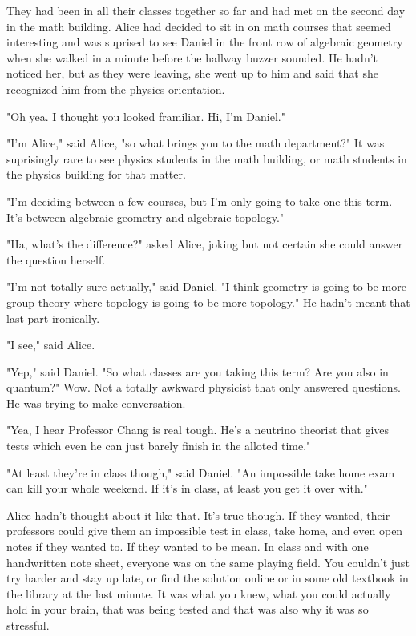 \mypause

They had been in all their classes together so far and had met on the second day in the math building. Alice had decided to sit in on math courses that seemed interesting and was suprised to see Daniel in the front row of algebraic geometry when she walked in a minute before the hallway buzzer sounded. He hadn't noticed her, but as they were leaving, she went up to him and said that she recognized him from the physics orientation. 

"Oh yea. I thought you looked framiliar. Hi, I'm Daniel."

"I'm Alice," said Alice, "so what brings you to the math department?" It was suprisingly rare to see physics students in the math building, or math students in the physics building for that matter.

"I'm deciding between a few courses, but I'm only going to take one this term. It's between algebraic geometry and algebraic topology."

"Ha, what's the difference?" asked Alice, joking but not certain she could answer the question herself.

"I'm not totally sure actually," said Daniel. "I think geometry is going to be more group theory where topology is going to be more topology." He hadn't meant that last part ironically.

"I see," said Alice.

"Yep," said Daniel. "So what classes are you taking this term? Are you also in quantum?" Wow. Not a totally awkward physicist that only answered questions. He was trying to make conversation.

"Yea, I hear Professor Chang is real tough. He's a neutrino theorist that gives tests which even he can just barely finish in the alloted time."

"At least they're in class though," said Daniel. "An impossible take home exam can kill your whole weekend. If it's in class, at least you get it over with."

Alice hadn't thought about it like that. It's true though. If they wanted, their professors could give them an impossible test in class, take home, and even open notes if they wanted to. If they wanted to be mean. In class and with one handwritten note sheet, everyone was on the same playing field. You couldn't just try harder and stay up late, or find the solution online or in some old textbook in the library at the last minute. It was what you knew, what you could actually hold in your brain, that was being tested and that was also why it was so stressful.

